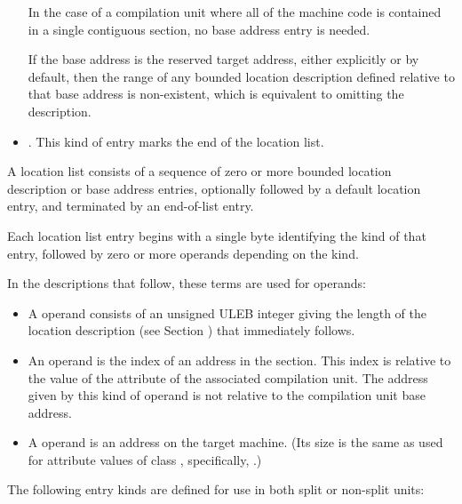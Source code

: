 \begin{itemize}
In the case of a compilation unit where all of the machine
code is contained in a single contiguous section, no base
address entry is needed.

\bb
If the base address is the reserved target address, either explicitly
or by default, then the range of any bounded location description
defined relative to that base address is non-existent, which is
equivalent to omitting the description.
\eb

\item  {}.
This kind of entry marks the end of the location list.

\end{itemize}

A location list consists of a sequence of zero or more bounded
location description or base address entries, optionally followed
by a default location entry, and terminated by an end-of-list
entry.

Each location list entry begins with a single byte identifying
the kind of that entry, followed by zero or more operands depending
on the kind.

In the descriptions that follow, these terms are used for operands:

\begin{itemize}
\item A  operand consists of
an unsigned ULEB integer giving the length of the location
description (see Section )
that immediately follows.

\item An  operand is the index of an address
in the \dotdebugaddr{} section. This index is relative to the
value of the \DWATaddrbase{} attribute of the associated
compilation unit. The address given by this kind
of operand is not relative to the compilation unit base address.

\item A  operand is an address on the target
machine. (Its size is the same as used for attribute values of
class \CLASSaddress, specifically, \DWFORMaddr.)

\end{itemize}

The following entry kinds are defined for use in both
split or non-split units:

